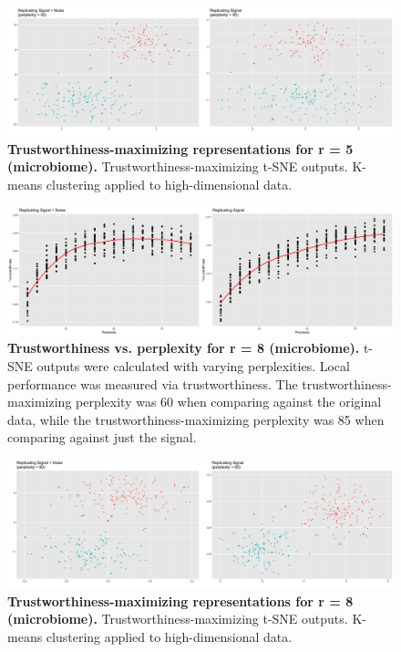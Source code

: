 \documentclass{article}
\begin{document}
\begin{figure}[H]
\centering
\includegraphics[scale=0.7]{Fig S12}
\caption{{\bf Trustworthiness-maximizing representations for r = 5 (microbiome).}
Trustworthiness-maximizing t-SNE outputs. K-means clustering applied to high-dimensional data.}
\end{figure}

\begin{figure}[H]
\centering
\includegraphics[scale=0.85]{Fig S13}
\caption{{\bf Trustworthiness vs. perplexity for r = 8 (microbiome).}
t-SNE outputs were calculated with varying perplexities. Local performance was measured via trustworthiness. The trustworthiness-maximizing perplexity was 60 when comparing against the original data, while the trustworthiness-maximizing perplexity was 85 when comparing against just the signal.}
\end{figure}

\begin{figure}[H]
\centering
\includegraphics[scale=0.7]{Fig S14}
\caption{{\bf Trustworthiness-maximizing representations for r = 8 (microbiome).}
Trustworthiness-maximizing t-SNE outputs. K-means clustering applied to high-dimensional data.}
\end{figure}
\end{document}
